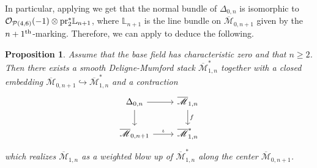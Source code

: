 \documentclass{amsart}
\newcommand{\bL}{\mathbb{L}}
\newcommand{\cO}{\mathcal{O}}
\newcommand{\cP}{\mathcal{P}}
\newcommand{\pr}{{\rm pr}}
\newtheorem{Prop}[theorem]{Proposition}
\theoremstyle{definition}
\begin{document}
In particular, applying  we get that the normal bundle of $\Delta_{0,n}$ is isomorphic to $\cO_{\cP(4,6)}(-1) \otimes \pr_2^*\bL_{n+1}$, where $\bL_{n+1}$ is the line bundle on $\overline{\mathscr{M}}_{0,n+1}$ given by the $n+1^{\rm th}$-marking. Therefore, we can apply  to deduce the following.
\begin{Prop}
    Assume that the base field has characteristic zero and that $n\geq 2$. Then there exists a smooth Deligne-Mumford stack $\overline{\mathscr{M}}_{1,n}^*$ together with a closed embedding $\overline{\mathscr{M}}_{0,n+1}\hookrightarrow \overline{\mathscr{M}}_{1,n}^*$ and a contraction
    \[
    \begin{tikzcd}
        \Delta_{0,n} \ar[r] \ar[d] & \overline{\mathscr{M}}_{1,n} \ar[d, "f"] \\
        \overline{\mathscr{M}}_{0,n+1} \ar[r, "\iota"] & \overline{\mathscr{M}}_{1,n}^*
    \end{tikzcd}
    \]
    which realizes $\overline{\mathscr{M}}_{1,n}$ as a weighted blow up of $\overline{\mathscr{M}}_{1,n}^*$ along the center $\overline{\mathscr{M}}_{0,n+1}$.
\end{Prop}
\end{document}
